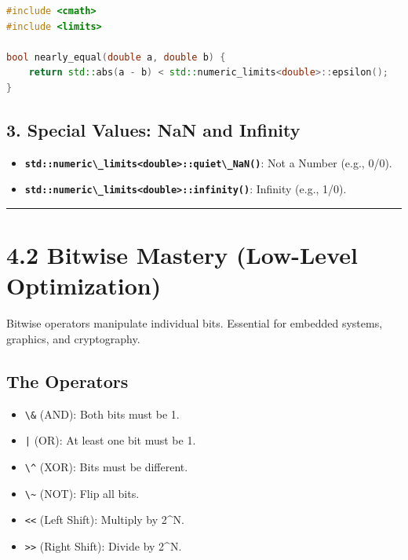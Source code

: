 \begin{lstlisting}[language={C++}]
#include <cmath>
#include <limits>

bool nearly_equal(double a, double b) {
    return std::abs(a - b) < std::numeric_limits<double>::epsilon();
}
\end{lstlisting}

\hypertarget{special-values-nan-and-infinity}{%
\subsection{3. Special Values: NaN and
Infinity}\label{special-values-nan-and-infinity}}

\begin{itemize}
\tightlist
\item
  \textbf{\passthrough{\lstinline!std::numeric\_limits<double>::quiet\_NaN()!}}:
  Not a Number (e.g., 0/0).
\item
  \textbf{\passthrough{\lstinline!std::numeric\_limits<double>::infinity()!}}:
  Infinity (e.g., 1/0).
\end{itemize}

\begin{center}\rule{0.5\linewidth}{0.5pt}\end{center}

\hypertarget{bitwise-mastery-low-level-optimization}{%
\section{4.2 Bitwise Mastery (Low-Level
Optimization)}\label{bitwise-mastery-low-level-optimization}}

Bitwise operators manipulate individual bits. Essential for embedded
systems, graphics, and cryptography.

\hypertarget{the-operators}{%
\subsection{The Operators}\label{the-operators}}

\begin{itemize}
\tightlist
\item
  \passthrough{\lstinline!\&!} (AND): Both bits must be 1.
\item
  \passthrough{\lstinline!|!} (OR): At least one bit must be 1.
\item
  \passthrough{\lstinline!\^!} (XOR): Bits must be different.
\item
  \passthrough{\lstinline!\~!} (NOT): Flip all bits.
\item
  \passthrough{\lstinline!<<!} (Left Shift): Multiply by 2\^{}N.
\item
  \passthrough{\lstinline!>>!} (Right Shift): Divide by 2\^{}N.
\end{itemize}

